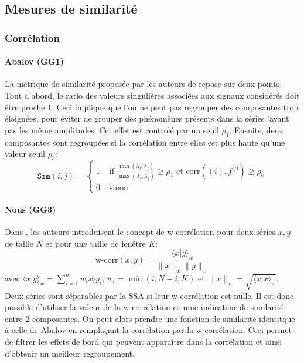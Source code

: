 \documentclass{gretsi}
\begin{document}

\subsection{Mesures de similarité}
\label{sub:sim}


\subsubsection{Corrélation}

\paragraph{Abalov (GG1)}
\label{par:}
La métrique de similarité proposée par les auteurs de \cite{abalov_14_aut} repose sur deux points. Tout d'abord, le ratio des valeurs singulières associées aux signaux considérés doit être proche 1. Ceci implique que l'on ne peut pas regrouper des composantes trop éloignées, pour éviter de grouper des phénomènes présents dans la séries 'ayant pas les même amplitudes. Cet effet est controlé par un seuil $\rho_1$. Ensuite, deux composantes sont regroupées si la corrélation entre elles est plus haute qu'une valeur seuil $\rho_c$:
$$
\texttt{Sim}(i, j) = \begin{cases}
	1 &\text{ if } \displaystyle\frac{\min(\lambda_i, \lambda_j)}{\max(\lambda_i, \lambda_j)} \ge \rho_1 \text{ et } \text{corr}({(i)}, f^{[j)}) \ge \rho_c\\
	0& \text{ sinon}
\end{cases}
$$

\paragraph{Nous (GG3)}
\label{par:nn}

Dans \cite{GNZ_10_SSA}, les auteurs introduisent le concept de w-corrélation pour deux séries $x, y$ de taille $N$ et pour une taille de fenêtre $K$:$$
\text{w-corr}(x, y) = \frac{\langle x|y\rangle_w}{\|x\|_w\|y\|_w}
$$avec $\langle x|y\rangle_w = \sum_{i=1}^n w_i x_i y_i$, $w_i = \min(i, N-i, K)$ et $\|x\|_w = \sqrt{\langle x|x\rangle_w}$. Deux séries sont séparables par la SSA si leur w-corrélation est nulle. Il est donc possible d'utiliser la valeur de la w-corrélation comme indicateur de similarité entre 2 composantes. On peut alors prendre une fonction de similarité identitque à celle de Abalov en remplaçant la corrélation par la w-corrélation. Ceci permet de filtrer les effets de bord qui peuvent apparaître dans la corrélation et ainsi d'obtenir un meilleur regroupement.
\end{document}
